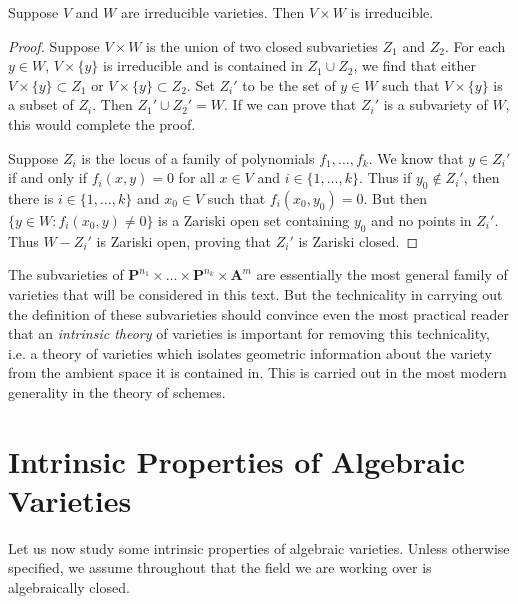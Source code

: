 \begin{theorem}
    Suppose $V$ and $W$ are irreducible varieties. Then $V \times W$ is irreducible.
\end{theorem}
\begin{proof}
    Suppose $V \times W$ is the union of two closed subvarieties $Z_1$ and $Z_2$. For each $y \in W$, $V \times \{ y \}$ is irreducible and is contained in $Z_1 \cup Z_2$, we find that either $V \times \{ y \} \subset Z_1$ or $V \times \{ y \} \subset Z_2$. Set $Z_i'$ to be the set of $y \in W$ such that $V \times \{ y \}$ is a subset of $Z_i$. Then $Z_1' \cup Z_2' = W$. If we can prove that $Z_i'$ is a subvariety of $W$, this would complete the proof.

    Suppose $Z_i$ is the locus of a family of polynomials $f_1,\dots,f_k$. We know that $y \in Z_i'$ if and only if $f_i(x,y) = 0$ for all $x \in V$ and $i \in \{ 1, \dots, k \}$. Thus if $y_0 \not \in Z_i'$, then there is $i \in \{ 1, \dots, k \}$ and $x_0 \in V$ such that $f_i(x_0,y_0) = 0$. But then $\{ y \in W : f_i(x_0,y) \neq 0 \}$ is a Zariski open set containing $y_0$ and no points in $Z_i'$. Thus $W - Z_i'$ is Zariski open, proving that $Z_i'$ is Zariski closed.
\end{proof}

The subvarieties of $\mathbf{P}^{n_1} \times \dots \times \mathbf{P}^{n_k} \times \mathbf{A}^m$ are essentially the most general family of varieties that will be considered in this text. But the technicality in carrying out the definition of these subvarieties should convince even the most practical reader that an \emph{intrinsic theory} of varieties is important for removing this technicality, i.e. a theory of varieties which isolates geometric information about the variety from the ambient space it is contained in. This is carried out in the most modern generality in the theory of schemes.














\chapter{Intrinsic Properties of Algebraic Varieties}

Let us now study some intrinsic properties of algebraic varieties. Unless otherwise specified, we assume throughout that the field we are working over is algebraically closed.

